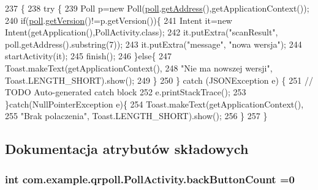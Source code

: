 \begin{DoxyCode}
237                          \{
238         \textcolor{keywordflow}{try} \{
239             Poll p=\textcolor{keyword}{new} Poll(\hyperlink{classcom_1_1example_1_1qrpoll_1_1_poll_activity_accbd807fe57852d64377c5a96401c376}{poll}.\hyperlink{classcom_1_1example_1_1qrpoll_1_1_poll_ac84c3d1747b6eb8d4f43da448de8080f}{getAddress}(),getApplicationContext());
240             \textcolor{keywordflow}{if}(\hyperlink{classcom_1_1example_1_1qrpoll_1_1_poll_activity_accbd807fe57852d64377c5a96401c376}{poll}.\hyperlink{classcom_1_1example_1_1qrpoll_1_1_poll_a6ec1751ddf25a1b00173e1c4f3203458}{getVersion}()!=p.getVersion())\{
241                 Intent it=\textcolor{keyword}{new} Intent(getApplication(),PollActivity.class);
242                 it.putExtra(\textcolor{stringliteral}{"scanResult"}, poll.getAddress().substring(7));
243                 it.putExtra(\textcolor{stringliteral}{"message"}, \textcolor{stringliteral}{"nowa wersja"});
244                 startActivity(it);
245                 finish();
246             \}\textcolor{keywordflow}{else}\{
247                 Toast.makeText(getApplicationContext(),
248                        \textcolor{stringliteral}{"Nie ma nowszej wersji"}, Toast.LENGTH\_SHORT).show();
249             \}
250         \} \textcolor{keywordflow}{catch} (JSONException e) \{
251             \textcolor{comment}{// TODO Auto-generated catch block}
252             e.printStackTrace();
253         \}\textcolor{keywordflow}{catch}(NullPointerException e)\{
254             Toast.makeText(getApplicationContext(),
255                        \textcolor{stringliteral}{"Brak polaczenia"}, Toast.LENGTH\_SHORT).show();
256         \}
257     \}
\end{DoxyCode}


\subsection{Dokumentacja atrybutów składowych}
\hypertarget{classcom_1_1example_1_1qrpoll_1_1_poll_activity_a0cb80128cd6ae3abb14437dbcf82f876}{
\subsubsection[{back\+Button\+Count}]{\setlength{\rightskip}{0pt plus 5cm}int com.\+example.\+qrpoll.\+Poll\+Activity.\+back\+Button\+Count =0\hspace{0.3cm}{\ttfamily [private]}}}\label{classcom_1_1example_1_1qrpoll_1_1_poll_activity_a0cb80128cd6ae3abb14437dbcf82f876}


